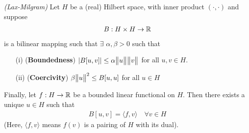 \documentclass[12pt,a4paper]{report}
\begin{document}
\thm \emph{(Lax-Milgram)} Let $H$ be a (real) Hilbert space, with inner product $(\cdot, \cdot)$ and suppose
\begin{align*}
B : H\times H \rightarrow \mathbb{R}
\end{align*}
is a bilinear mapping such that $\exists$ $\alpha, \beta >0$ such that
\begin{itemize}
\item[(i)] (\textbf{Boundedness}) $|B[u,v]| \leq \alpha \bigl\lVert u\bigr\rVert_{} \bigl\lVert v\bigr\rVert_{}$ for all $u,v \in H$. 
\item[(ii)] (\textbf{Coercivity}) $\beta \bigl\lVert u\bigr\rVert_{}^2 \leq B[u,u]$ for all $u \in H$ 
\end{itemize}
Finally, let $f: H\rightarrow \mathbb{R}$ be a bounded linear functional on $H$. Then there exists a unique $u\in H$ such that
\begin{align*}
B[u,v] = \langle f, v\rangle \quad \forall v \in H
\end{align*}
(Here, $\langle f,v\rangle$ means $f(v)$ is a pairing of $H$ with its dual).
\end{document}
